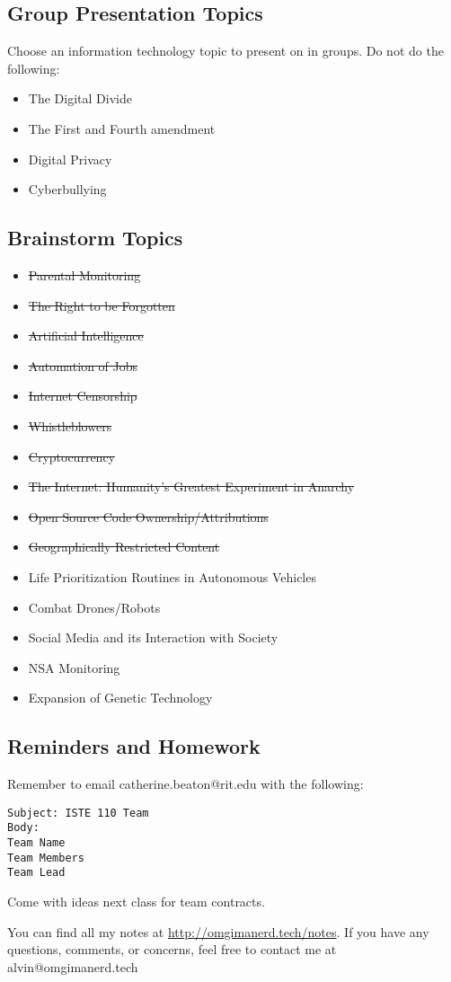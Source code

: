 \documentclass[letterpaper, 12pt]{article}
\begin{document}
\subsection*{Group Presentation Topics}
Choose an information technology topic to present on in groups. Do not do the
following:
\begin{itemize}
  \item The Digital Divide
  \item The First and Fourth amendment
  \item Digital Privacy
  \item Cyberbullying
\end{itemize}

\subsection*{Brainstorm Topics}
\begin{itemize}
  \item \sout{Parental Monitoring}
  \item \sout{The Right to be Forgotten}
  \item \sout{Artificial Intelligence}
  \item \sout{Automation of Jobs}
  \item \sout{Internet Censorship}
  \item \sout{Whistleblowers}
  \item \sout{Cryptocurrency}
  \item \sout{The Internet: Humanity's Greatest Experiment in Anarchy}
  \item \sout{Open Source Code Ownership/Attributions}
  \item \sout{Geographically Restricted Content}
  \item Life Prioritization Routines in Autonomous Vehicles
  \item Combat Drones/Robots
  \item Social Media and its Interaction with Society
  \item NSA Monitoring
  \item Expansion of Genetic Technology
\end{itemize}

\subsection*{Reminders and Homework}
Remember to email catherine.beaton@rit.edu with the following:
\begin{verbatim}
Subject: ISTE 110 Team
Body:
Team Name
Team Members
Team Lead
\end{verbatim}
Come with ideas next class for team contracts.

\begin{center}
  You can find all my notes at \url{http://omgimanerd.tech/notes}. If you have
  any questions, comments, or concerns, feel free to contact me at
  alvin@omgimanerd.tech
\end{center}
\end{document}
